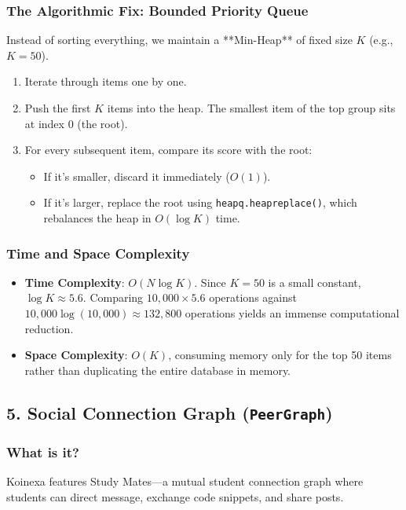 \documentclass[11pt,a4paper]{article}
\begin{document}
\subsubsection{The Algorithmic Fix: Bounded Priority Queue}
Instead of sorting everything, we maintain a **Min-Heap** of fixed size $K$ (e.g., $K = 50$).
\begin{enumerate}
    \item Iterate through items one by one.
    \item Push the first $K$ items into the heap. The smallest item of the top group sits at index 0 (the root).
    \item For every subsequent item, compare its score with the root:
    \begin{itemize}
        \item If it's smaller, discard it immediately ($O(1)$).
        \item If it's larger, replace the root using \texttt{heapq.heapreplace()}, which rebalances the heap in $O(\log K)$ time.
    \end{itemize}
\end{enumerate}

\subsubsection{Time and Space Complexity}
\begin{itemize}
    \item \textbf{Time Complexity}: $O(N \log K)$. Since $K = 50$ is a small constant, $\log K \approx 5.6$. Comparing $10,000 \times 5.6$ operations against $10,000 \log(10,000) \approx 132,800$ operations yields an immense computational reduction.
    \item \textbf{Space Complexity}: $O(K)$, consuming memory only for the top 50 items rather than duplicating the entire database in memory.
\end{itemize}

\subsection{5. Social Connection Graph (\texttt{PeerGraph})}

\subsubsection{What is it?}
Koinexa features Study Mates—a mutual student connection graph where students can direct message, exchange code snippets, and share posts.
\end{document}
